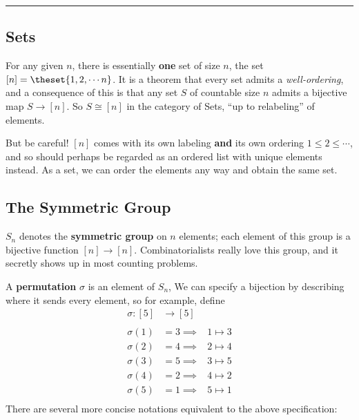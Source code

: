 \begin{center}\rule{0.5\linewidth}{\linethickness}\end{center}

\hypertarget{sets}{%
\subsection{Sets}\label{sets}}

For any given \(n\), there is essentially \textbf{one} set of size
\(n\), the set \([n] = \theset{1,2,\cdots n}\). It is a theorem that
every set admits a \emph{well-ordering}, and a consequence of this is
that any set \(S\) of countable size \(n\) admits a bijective map
\(S \to [n]\). So \(S \cong [n]\) in the category of Sets, ``up to
relabeling'' of elements.

But be careful! \([n]\) comes with its own labeling \textbf{and } its
own ordering \(1 \leq 2 \leq \cdots\), and so should perhaps be regarded
as an ordered list with unique elements instead. As a set, we can order
the elements any way and obtain the same set.

\hypertarget{the-symmetric-group}{%
\subsection{The Symmetric Group}\label{the-symmetric-group}}

\(S_n\) denotes the \textbf{symmetric group} on \(n\) elements; each
element of this group is a bijective function \([n]\to[n]\).
Combinatorialists really love this group, and it secretly shows up in
most counting problems.

A \textbf{permutation} \(\sigma\) is an element of \(S_n\), We can
specify a bijection by describing where it sends every element, so for
example, define \[\begin{aligned}
\sigma: [5] &\to [5] &\\ \\
\sigma(1) &= 3 \implies &1 \mapsto 3 \\
\sigma(2) &= 4 \implies &2 \mapsto 4 \\
\sigma(3) &= 5 \implies &3 \mapsto 5 \\
\sigma(4) &= 2 \implies &4 \mapsto 2 \\
\sigma(5) &= 1 \implies &5 \mapsto 1 \\
\end{aligned}\] There are several more concise notations equivalent to
the above specification:


